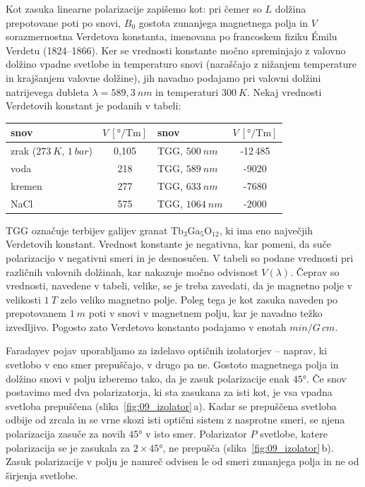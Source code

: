 Kot zasuka linearne polarizacije zapišemo kot:
pri čemer so $L$ dolžina prepotovane poti po snovi, $B_0$ gostota zunanjega 
magnetnega polja in $V$ sorazmernostna Verdetova konstanta, imenovana po francoskem 
fiziku \'{E}milu Verdetu (1824--1866). Ker se vrednosti konstante močno 
spreminjajo z valovno dolžino vpadne svetlobe in temperaturo snovi 
(naraščajo z nižanjem temperature in krajšanjem valovne dolžine), jih navadno
podajamo pri valovni dolžini natrijevega dubleta $\lambda = 589,3~\si{nm}$ in 
temperaturi $300~\si{K}$. 
Nekaj vrednosti Verdetovih konstant je podanih v tabeli:

\begin{center}
\begin{tabular}{|l|c||l|c|}
\hline
snov& $V~[\si{\degree/\tesla\metre}]$ & snov& $V~[\si{\degree/\tesla\metre}]$\\ \hline 
zrak ($273~\si{K}$, $1~\si{bar}$) & 0,105 & TGG, $500~\si{nm}$ & -12\,485    \\ \hline
voda & 218 & TGG, $589~\si{nm}$ & -9020\\ \hline
kremen & 277 & TGG, $633~\si{nm}$ & -7680\\ \hline
NaCl & 575 & TGG, $1064~\si{nm}$ & -2000\\ \hline
\end{tabular}
\end{center}

TGG označuje terbijev galijev granat Tb$_3$Ga$_5$O$_{12}$, ki ima eno največjih Verdetovih konstant.
Vrednost konstante je negativna, kar pomeni, da suče polarizacijo v negativni smeri in je 
desnosučen. V tabeli so podane vrednosti pri različnih valovnih dolžinah, kar nakazuje močno
odvisnost $V(\lambda)$. Čeprav so vrednosti, navedene v tabeli, velike, 
se je treba zavedati, da je magnetno polje v velikosti $1~\si{T}$
zelo veliko magnetno polje. Poleg tega je kot zasuka naveden po prepotovanem $1~\si{m}$ poti v snovi 
v magnetnem polju, kar je navadno težko izvedljivo. Pogosto zato Verdetovo konstanto
podajamo v enotah $\si{min}/\si{G\,cm}$. 

Faradayev pojav uporabljamo za izdelavo optičnih izolatorjev -- naprav, ki svetlobo
v eno smer prepuščajo, v drugo pa ne. Gostoto magnetnega polja in dolžino snovi v polju 
izberemo tako, da je zasuk polarizacije enak $45\si{\degree}$. Če snov postavimo med dva 
polarizatorja, ki sta zasukana za isti kot, je vsa vpadna svetloba prepuščena 
(slika~\ref{fig:09_izolator}\,a). Kadar se prepuščena svetloba odbije od zrcala in se vrne
skozi isti optični sistem z nasprotne smeri, se njena polarizacija zasuče za novih $45\si{\degree}$
v isto smer. Polarizator $P$ svetlobe, katere polarizacija se je zasukala za
 $2 \times 45\si{\degree}$, ne prepušča (slika~\ref{fig:09_izolator}\,b). Zasuk
polarizacije v polju je namreč odvisen le od smeri zunanjega polja in ne od širjenja
svetlobe. 

